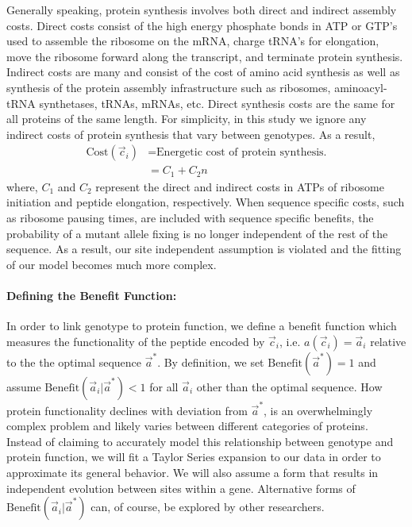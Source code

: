 \documentclass{article}
\newcommand{\cvec}{\ensuremath{\Vec{c}}\xspace}
\newcommand{\cveci}{\ensuremath{\cvec_i}\xspace}
\newcommand{\aveci}{\ensuremath{\Vec{a}_i}\xspace}
\newcommand{\aoptvec}{\ensuremath{\Vec{a}^*}\xspace}
\newcommand{\Costcveci}{\ensuremath{\text{Cost}(\cveci)}\xspace}
\newcommand{\Func}{\ensuremath{\text{Benefit}}\xspace}
\newcommand{\Funcaveci}{\ensuremath{\Func(\aveci|\aoptvec)}\xspace}
\newcommand{\Funcaoptvec}{\ensuremath{\Func(\aoptvec)}\xspace}
\begin{document}
Generally speaking, protein synthesis involves both direct and indirect assembly costs.
Direct costs consist of the high energy phosphate bonds in ATP or GTP's used to assemble the ribosome on the mRNA, charge tRNA's for elongation, move the ribosome forward along the transcript, and terminate protein synthesis.
Indirect costs are many and consist of the cost of amino acid synthesis as well as synthesis of the protein assembly infrastructure such as ribosomes, aminoacyl-tRNA synthetases, tRNAs, mRNAs, etc.
Direct synthesis costs are the same for all proteins of the same length.
For simplicity, in this study we ignore any indirect costs of protein synthesis that vary between genotypes.
As a result, 
\begin{align}
\label{eq:defineCost}
  \Costcveci  &= \text{Energetic cost of protein synthesis.}\\
  &= C_1 + C_2 n
\end{align}
where, $C_1$ and $C_2$ represent the direct and indirect costs in ATPs of ribosome initiation and peptide elongation, respectively.
When sequence specific costs, such as ribosome pausing times, are included with sequence specific benefits, the probability of a mutant allele fixing is no longer independent of the rest of the sequence.
As a result, our site independent assumption is violated and the fitting of our model becomes much more complex.

\paragraph*{Defining the Benefit Function: }
In order to link genotype to protein function, we define a benefit function which measures the functionality of the peptide encoded by \cveci, i.e. $a(\cveci) = \aveci$ relative to the the optimal sequence $\aoptvec$.
By definition, we set $\Funcaoptvec = 1$ and assume $\Funcaveci < 1$ for all $\aveci$ other than the optimal sequence.
How protein functionality declines with deviation from \aoptvec, is an overwhelmingly complex problem and likely varies between different categories of proteins.
Instead of claiming to accurately model this relationship between genotype and protein function, we will fit a Taylor Series expansion to our data in order to approximate its general behavior.
We will also assume a form that results in independent evolution between sites within a gene.
Alternative forms of \Funcaveci can, of course, be explored by other researchers.
\end{document}
